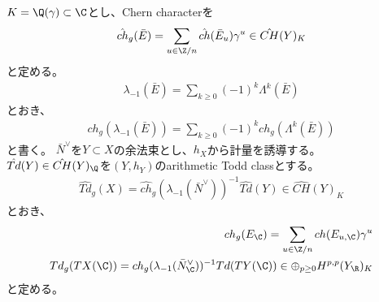 \documentclass[uplatex, a4paper]{jsbook}
\begin{document}
$K=\Q(\gamma)\subset\C$とし、Chern characterを
\begin{align*}
\hat{ch}_g(\bar{E})=\sum_{u\in\Z/n}\hat{ch}(\bar{E}_u)\gamma^u \in \hat{CH}(Y)_K
\end{align*}
と定める。
\begin{align*}
\lambda_{-1}(\bar{E})=\sum_{k\geq0}(-1)^k\Lambda^k(\bar{E})
\end{align*}
とおき、
\begin{align*}
ch_g(\lambda_{-1}(\bar{E}))=\sum_{k\geq0}(-1)^kch_g(\Lambda^k(\bar{E}))
\end{align*}
と書く。
$\bar{N}^\vee$を$Y \subset X$の余法束とし、$h_X$から計量を誘導する。
$\hat{Td}(Y) \in \hat{CH}(Y)_\Q$を$(Y,h_Y)$のarithmetic Todd classとする。
\begin{align*}
\hat{Td}_g(X)=\hat{ch}_g(\lambda_{-1}(\bar{N}^\vee))^{-1}\hat{Td}(Y)\in\hat{CH}(Y)_K
\end{align*}
とおき、
\begin{align*}
ch_g(E_\C)=\sum_{u\in\Z/n}ch(E_{u,\C})\gamma^u\\
Td_g(TX(\C))=ch_g(\lambda_{-1}(\bar{N}^\vee_\C))^{-1}Td(TY(\C))\in\oplus_{p\geq0}H^{p,p}(Y_\R)_K
\end{align*}
と定める。

\begin{thm}[Theorem 3.1]
\end{thm}
\end{document}
